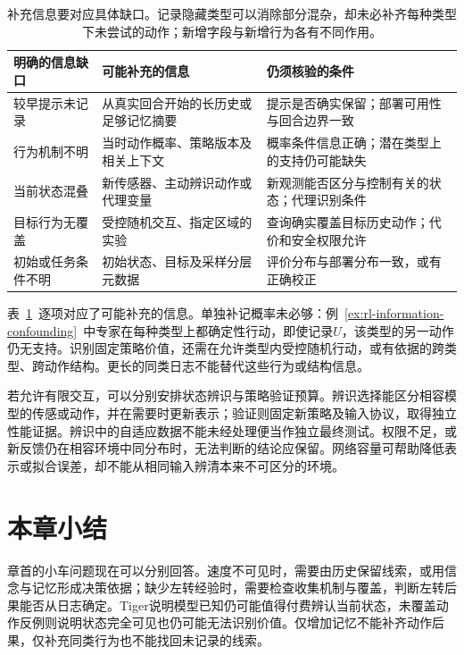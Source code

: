 \begin{table}[htbp]
  \centering
  \small
  \begin{tabularx}{\linewidth}{p{26mm}XX}
    \toprule
    明确的信息缺口 & 可能补充的信息 & 仍须核验的条件 \\
    \midrule
    较早提示未记录 & 从真实回合开始的长历史或足够记忆摘要 & 提示是否确实保留；部署可用性与回合边界一致 \\
    行为机制不明 & 当时动作概率、策略版本及相关上下文 & 概率条件信息正确；潜在类型上的支持仍可能缺失 \\
    当前状态混叠 & 新传感器、主动辨识动作或代理变量 & 新观测能否区分与控制有关的状态；代理识别条件 \\
    目标行为无覆盖 & 受控随机交互、指定区域的实验 & 查询确实覆盖目标历史动作；代价和安全权限允许 \\
    初始或任务条件不明 & 初始状态、目标及采样分层元数据 & 评价分布与部署分布一致，或有正确校正 \\
    \bottomrule
  \end{tabularx}
  \caption{补充信息要对应具体缺口。记录隐藏类型可以消除部分混杂，却未必补齐每种类型下未尝试的动作；新增字段与新增行为各有不同作用。}
  \label{tab:rl-information-information-repair}
\end{table}

表~\ref{tab:rl-information-information-repair}~逐项对应了可能补充的信息。单独补记概率未必够：例~\ref{ex:rl-information-confounding}~中专家在每种类型上都确定性行动，即使记录$U$，该类型的另一动作仍无支持。识别固定策略价值，还需在允许类型内受控随机行动，或有依据的跨类型、跨动作结构。更长的同类日志不能替代这些行为或结构信息。

若允许有限交互，可以分别安排状态辨识与策略验证预算。辨识选择能区分相容模型的传感或动作，并在需要时更新表示；验证则固定新策略及输入协议，取得独立性能证据。辨识中的自适应数据不能未经处理便当作独立最终测试。权限不足，或新反馈仍在相容环境中同分布时，无法判断的结论应保留。网络容量可帮助降低表示或拟合误差，却不能从相同输入辨清本来不可区分的环境。

\section{本章小结}
\label{sec:rl-information-summary}

章首的小车问题现在可以分别回答。速度不可见时，需要由历史保留线索，或用信念与记忆形成决策依据；缺少左转经验时，需要检查收集机制与覆盖，判断左转后果能否从日志确定。Tiger说明模型已知仍可能值得付费辨认当前状态，未覆盖动作反例则说明状态完全可见也仍可能无法识别价值。仅增加记忆不能补齐动作后果，仅补充同类行为也不能找回未记录的线索。

